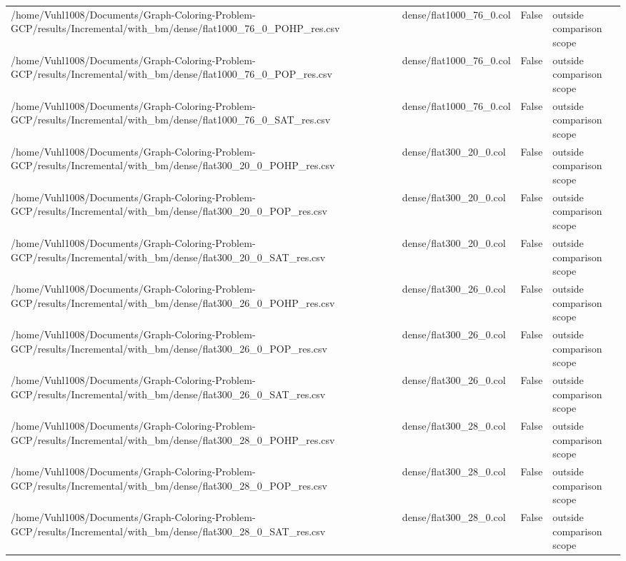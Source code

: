\begin{table}[htbp]
\begin{tabular}{llll}
/home/Vuhl1008/Documents/Graph-Coloring-Problem-GCP/results/Incremental/with\_bm/dense/flat1000\_76\_0\_POHP\_res.csv & dense/flat1000\_76\_0.col & False & outside comparison scope \\
/home/Vuhl1008/Documents/Graph-Coloring-Problem-GCP/results/Incremental/with\_bm/dense/flat1000\_76\_0\_POP\_res.csv & dense/flat1000\_76\_0.col & False & outside comparison scope \\
/home/Vuhl1008/Documents/Graph-Coloring-Problem-GCP/results/Incremental/with\_bm/dense/flat1000\_76\_0\_SAT\_res.csv & dense/flat1000\_76\_0.col & False & outside comparison scope \\
/home/Vuhl1008/Documents/Graph-Coloring-Problem-GCP/results/Incremental/with\_bm/dense/flat300\_20\_0\_POHP\_res.csv & dense/flat300\_20\_0.col & False & outside comparison scope \\
/home/Vuhl1008/Documents/Graph-Coloring-Problem-GCP/results/Incremental/with\_bm/dense/flat300\_20\_0\_POP\_res.csv & dense/flat300\_20\_0.col & False & outside comparison scope \\
/home/Vuhl1008/Documents/Graph-Coloring-Problem-GCP/results/Incremental/with\_bm/dense/flat300\_20\_0\_SAT\_res.csv & dense/flat300\_20\_0.col & False & outside comparison scope \\
/home/Vuhl1008/Documents/Graph-Coloring-Problem-GCP/results/Incremental/with\_bm/dense/flat300\_26\_0\_POHP\_res.csv & dense/flat300\_26\_0.col & False & outside comparison scope \\
/home/Vuhl1008/Documents/Graph-Coloring-Problem-GCP/results/Incremental/with\_bm/dense/flat300\_26\_0\_POP\_res.csv & dense/flat300\_26\_0.col & False & outside comparison scope \\
/home/Vuhl1008/Documents/Graph-Coloring-Problem-GCP/results/Incremental/with\_bm/dense/flat300\_26\_0\_SAT\_res.csv & dense/flat300\_26\_0.col & False & outside comparison scope \\
/home/Vuhl1008/Documents/Graph-Coloring-Problem-GCP/results/Incremental/with\_bm/dense/flat300\_28\_0\_POHP\_res.csv & dense/flat300\_28\_0.col & False & outside comparison scope \\
/home/Vuhl1008/Documents/Graph-Coloring-Problem-GCP/results/Incremental/with\_bm/dense/flat300\_28\_0\_POP\_res.csv & dense/flat300\_28\_0.col & False & outside comparison scope \\
/home/Vuhl1008/Documents/Graph-Coloring-Problem-GCP/results/Incremental/with\_bm/dense/flat300\_28\_0\_SAT\_res.csv & dense/flat300\_28\_0.col & False & outside comparison scope \\

\end{tabular}
\end{table}
